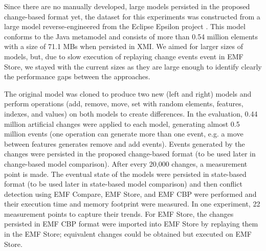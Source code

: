 Since there are no manually developed, large models persisted in the proposed change-based format yet, the dataset for this experiments was constructed from a large model reverse-engineered from the Eclipse Epsilon project \cite{eclipse2018epsilongit,eclipse2017epsilon}. This model conforms to the Java metamodel \cite{eclipse2018modiscojava} and consists of more than 0.54 million elements with a size of 71.1 MBs when persisted in XMI. We aimed for larger sizes of models, but, due to slow execution of replaying change events event in EMF Store, we stayed with the current sizes as they are large enough to identify clearly the performance gaps between the approaches.

The original model was cloned to produce two new (left and right) models and perform operations (\textsf{add}, \textsf{remove}, \textsf{move}, \textsf{set} with random elements, features, indexes, and values) on both models to create differences. In the evaluation, 0.44 million artificial changes were applied to each model, generating almost 0.5 million events (one operation can generate more than one event, e.g. a \textsf{move} between features generates \textsf{remove} and \textsf{add} events). Events generated by the changes were persisted in the proposed change-based format (to be used later in change-based model comparison). After every 20,000 changes, a measurement point is made. The eventual state of the models were persisted in state-based format (to be used later in state-based model comparison) and then conflict detection using EMF Compare, EMF Store, and EMF CBP were performed and their execution time and memory footprint were measured. In one experiment, 22 measurement points to capture their trends. For EMF Store, the changes persisted in EMF CBP format were imported into EMF Store by replaying them in the EMF Store; equivalent changes could be obtained but executed on EMF Store. 


